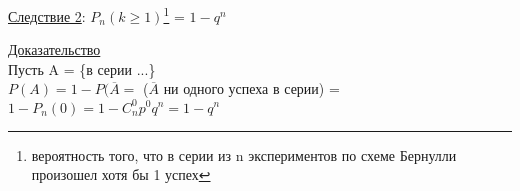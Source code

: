 \underline{Следствие 2}:
$P_n(k \geqslant 1)$\footnote{вероятность того, что в серии из n экспериментов по схеме Бернулли произошел хотя бы 1 успех} = $1 - q^n$

\underline{Доказательство} \\
Пусть A = \{в серии ...\} \\
$P(A) = 1 - P(\overline{A} = $ ($\overline{A}$ ни одного успеха в серии) = $1 - P_n(0) = 1 - C^0_n p^0 q^n = 1 - q^n$
























